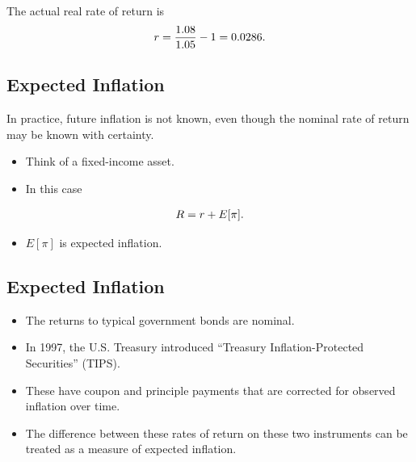 \documentclass[letterpaper,10pt,english]{sphinxmanual}
\begin{document}
The actual real rate of return is
\begin{gather}
\begin{split}r = \frac{1.08}{1.05} - 1 = 0.0286.\end{split}\notag
\end{gather}

\subsection{Expected Inflation}
\label{returns:expected-inflation}
In practice, future inflation is not known, even though the nominal
rate of return may be known with certainty.
\begin{itemize}
\item {} 
Think of a fixed-income asset.

\end{itemize}
\begin{itemize}
\item {} 
In this case

\end{itemize}
\begin{gather}
\begin{split}R = r + E[\pi].\end{split}\notag
\end{gather}\begin{itemize}
\item {} 
$E[\pi]$ is expected inflation.

\end{itemize}


\subsection{Expected Inflation}
\label{returns:id4}\begin{itemize}
\item {} 
The returns to typical government bonds are nominal.

\end{itemize}
\begin{itemize}
\item {} 
In 1997, the U.S. Treasury introduced ``Treasury Inflation-Protected
Securities'' (TIPS).

\end{itemize}
\begin{itemize}
\item {} 
These have coupon and principle payments that
are corrected for observed inflation over time.

\end{itemize}
\begin{itemize}
\item {} 
The difference between these rates of return on these two
instruments can be treated as a measure of expected inflation.

\end{itemize}
\end{document}
